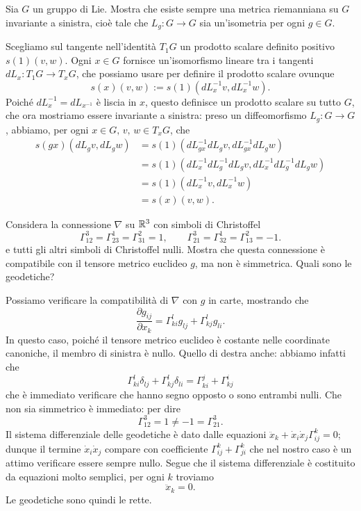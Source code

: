 \documentclass[a4paper]{article}
\begin{document}
\begin{ex}[9.7]{Sia $ G $ un gruppo di Lie. Mostra che esiste sempre una metrica riemanniana su $ G $ invariante a sinistra, cioè tale che $ L_g \colon G \to G $ sia un’isometria per ogni $ g \in G $.}
	
	Scegliamo sul tangente nell'identità $ T_1G $ un prodotto scalare definito positivo $ s(1)(v, w) $. Ogni $ x \in G $ fornisce un'isomorfismo lineare tra i tangenti $ dL_x \colon T_1G \to T_xG $, che possiamo usare per definire il prodotto scalare ovunque
	\[ s(x)(v, w) := s(1)(dL_x^{-1} v,dL_x^{-1} w ). \]
	Poiché $ dL_x^{-1} = dL_{x^{-1}} $ è liscia in $ x $, questo definisce un prodotto scalare su tutto $ G $, che ora mostriamo essere invariante a sinistra: preso un diffeomorfismo $ L_g \colon G \to G $, abbiamo, per ogni $ x \in G, \, v, \, w \in T_xG $, che
	\begin{align*}
		s(gx)(dL_g v, dL_g w) &=
		s(1)(dL_{gx}^{-1}dL_g v, dL_{gx}^{-1}dL_g w) \\
		& = s(1)(dL_{x}^{-1}dL_{g}^{-1}dL_g v, dL_{x}^{-1}dL_{g}^{-1}dL_g w)\\
		& = s(1)(dL_{x}^{-1} v, dL_{x}^{-1} w)\\
		& = s(x)(v, w).
	\end{align*}
\end{ex}

\begin{ex}[10.1]{ Considera la connessione $ \nabla $ su $ \mathbb{R}^3 $ con simboli di Christoffel
		\[ \Gamma_{12}^3 = \Gamma_{23}^1 = \Gamma_{31}^2 = 1, \qquad \Gamma_{21}^3 = \Gamma_{32}^1 = \Gamma_{13}^2 = -1. \]
		e tutti gli altri simboli di Christoffel nulli. Mostra che questa connessione è
		compatibile con il tensore metrico euclideo $ g $, ma non è simmetrica. Quali sono le geodetiche?}
	
	Possiamo verificare la compatibilità di $ \nabla $ con $ g $ in carte, mostrando che
	\[ \frac{\partial g_{ij}}{\partial x_k} = \Gamma_{ki}^lg_{lj} + \Gamma_{kj}^lg_{li}. \]
	In questo caso, poiché il tensore metrico euclideo è costante nelle coordinate canoniche, il membro di sinistra è nullo. Quello di destra anche: abbiamo infatti che 
	\[ \Gamma_{ki}^l\delta_{lj} + \Gamma_{kj}^l\delta_{li} =
	\Gamma_{ki}^j + \Gamma_{kj}^i
	\]
	che è immediato verificare che hanno segno opposto o sono entrambi nulli. Che non sia simmetrico è immediato: per dire
	\[ \Gamma_{12}^3 = 1 \neq -1 = \Gamma_{21}^3. \]
	Il sistema differenziale delle geodetiche è dato dalle equazioni $ \ddot{x}_k +\dot{x}_i\dot{x}_j \Gamma_{ij}^k = 0 $; dunque il termine $ \dot{x}_i\dot{x}_j $ compare con coefficiente $ \Gamma_{ij}^k + \Gamma_{ji}^k $ che nel nostro caso è un attimo verificare essere sempre nullo. Segue che il sistema differenziale è costituito da equazioni molto semplici, per ogni $ k $ troviamo
	\[ \ddot{x}_k = 0. \]
	Le geodetiche sono quindi le rette.
\end{ex}
\end{document}
